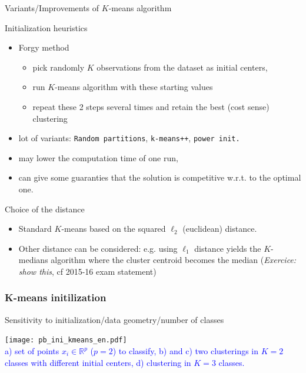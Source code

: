 \documentclass[compress, smaller, serif, 9pt]{beamer}
\newcommand{\structuretext}[1]{{\usebeamercolor[fg]{structure} #1}}
\newcommand{\doigt}{\structuretext{\noindent \Pisymbol{pzd}{43}}}
\begin{document}
\begin{frame}{Variants/Improvements of $K$-means algorithm}

\begin{block}{Initialization heuristics}
\begin{itemize}
 \item Forgy method
\begin{itemize}
 \item pick randomly $K$ observations  from the dataset as initial centers,
 \item run $K$-means algorithm with these starting values
 \item repeat these 2 steps several times and retain the best (cost sense) clustering 
\end{itemize}
 
\item lot of variants: \texttt{Random partitions}, \texttt{k-means++}, \texttt{power init.}
\item[\doigt] may lower the computation time of one run,
\item[\doigt] can give some guaranties that the  solution is competitive w.r.t. to the optimal one.

\end{itemize}

\end{block}


\begin{block}{Choice of the distance}

\begin{itemize}
 \item Standard $K$-means based on the squared $\ell_2$ (euclidean) distance.
 \item Other distance can be considered: e.g. using $\ell_1$ distance yields
 the $K$-medians algorithm where the cluster centroid becomes the median
 ({\em Exercice: show this}, cf 2015-16 exam statement)
\end{itemize}
\end{block}

\end{frame}



\begin{frame}
   \frametitle{K-means initilization}
   \begin{block}{Sensitivity to initialization/data geometry/number of classes}
   \end{block}
   \begin{center}
    \texttt{[image: pb\_ini\_kmeans\_en.pdf]}\\
    \textcolor{blue}{a) set of points $x_i\in \mathbb{R}^p$ ($p=2$) to classify, b) and c) two clusterings in
      $K=2$ classes with different initial centers, d) clustering in $K=3$ classes.}
    \end{center}


    
    \end{frame}
\end{document}
